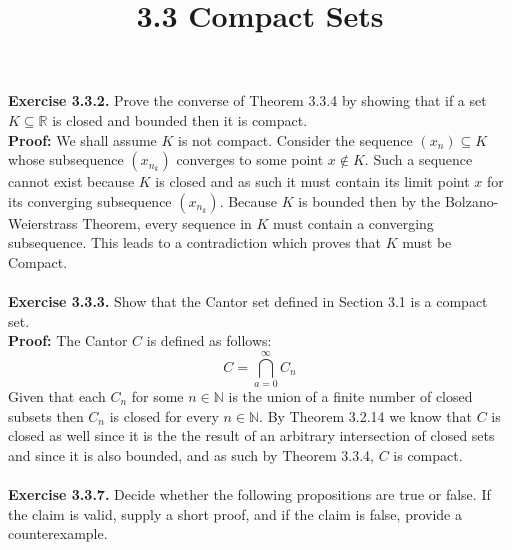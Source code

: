 \documentclass{article}
\title{\textbf{3.3 Compact Sets}}
\begin{document}
\maketitle
\textbf{Exercise 3.3.2.} Prove the converse of Theorem 3.3.4 by showing that if a set $K \subseteq \mathbb{R}$ is closed and bounded then it is compact. \\
\textbf{Proof:} We shall assume $K$ is not compact. Consider the sequence $(x_n) \subseteq K$ whose subsequence $(x_{n_k})$ converges to some point $x \not\in K$. Such a sequence cannot exist because $K$ is closed and as such it must contain its limit point $x$ for its converging subsequence $(x_{n_k})$. Because $K$ is bounded then by the Bolzano-Weierstrass Theorem, every sequence in $K$ must contain a converging subsequence. This leads to a contradiction which proves that $K$ must be Compact. \\ \\
\textbf{Exercise 3.3.3.} Show that the Cantor set defined in Section 3.1 is a compact set. \\
\textbf{Proof:} The Cantor $C$ is defined as follows:
			$$C = \bigcap_{a = 0}^\infty C_n$$
Given that each $C_n$ for some $n \in \mathbb{N}$ is the union of a finite number of closed subsets then $C_n$ is closed for every $n \in \mathbb{N}$. By Theorem 3.2.14 we know that $C$ is closed as well since it is the the result of an arbitrary intersection of closed sets and since it is also bounded, and as such by Theorem 3.3.4, $C$ is compact. \\ \\
\textbf{Exercise 3.3.7.} Decide whether the following propositions are true or false. If the claim is valid, supply a short proof, and if the claim is false, provide a counterexample.
\end{document}
